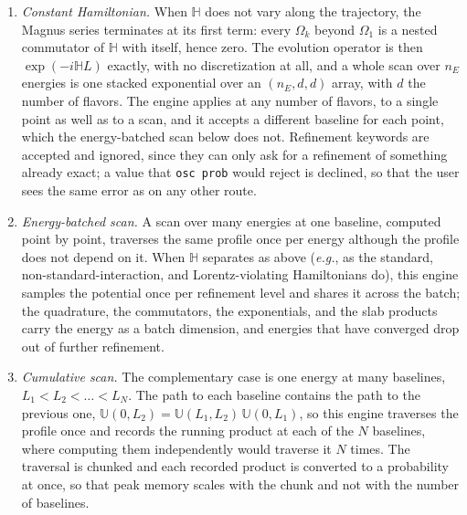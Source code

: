 \documentclass[final,5p,times,twocolumn,sort,compress]{elsarticle}
\makeatletter
\newcommand{\eg}{{\it e.g.}}
\DeclareRobustCommand{\_}{%
  \ifmmode\nfss@text{\textunderscore}\else\textunderscore\allowbreak\fi}
\makeatother
\begin{document}
\begin{enumerate}
Four conditions must hold for this engine to take a request: two flavors, a profile built with {\tt exp\_density\_profile} (the default of the solar wrappers; a tabulated solar model is not one), a single baseline, and no slab edges or breakpoints. Under {\tt strategy='auto'}, it is also skipped when a request at a tolerance of $10^{-6}$ or looser goes to the general ladder, as described below. (The limit of two flavors is empirical: the neglected second-order term is about a thousand times larger at three flavors than at two, and the number of slabs needed to certify an answer is then too large for the engine to be fast.) At an MSW resonance, the matter term is no longer small, the answers stop agreeing before the engine reaches its limit on the number of slabs, and the request passes to the next engine.
\smallskip
\item \emph{Constant Hamiltonian.} When $\mathbb{H}$ does not vary along the trajectory, the Magnus series terminates at its first term: every $\Omega_k$ beyond $\Omega_1$ is a nested commutator of $\mathbb{H}$ with itself, hence zero. The evolution operator is then $\exp(-i\mathbb{H}L)$ exactly, with no discretization at all, and a whole scan over $n_E$ energies is one stacked exponential over an $(n_E, d, d)$ array, with $d$ the number of flavors. The engine applies at any number of flavors, to a single point as well as to a scan, and it accepts a different baseline for each point, which the energy-batched scan below does not. Refinement keywords are accepted and ignored, since they can only ask for a refinement of something already exact; a value that {\tt osc\_prob} would reject is declined, so that the user sees the same error as on any other route.
\smallskip
\item \emph{Energy-batched scan.} A scan over many energies at one baseline, computed point by point, traverses the same profile once per energy although the profile does not depend on it. When $\mathbb{H}$ separates as above (\eg, as the standard, non-standard-interaction, and Lorentz-violating Hamiltonians do), this engine samples the potential once per refinement level and shares it across the batch; the quadrature, the commutators, the exponentials, and the slab products carry the energy as a batch dimension, and energies that have converged drop out of further refinement.
\smallskip
\item \emph{Cumulative scan.} The complementary case is one energy at many baselines, $L_1 < L_2 < \dots < L_N$. The path to each baseline contains the path to the previous one, $\mathbb{U}(0, L_2) = \mathbb{U}(L_1, L_2)\,\mathbb{U}(0, L_1)$, so this engine traverses the profile once and records the running product at each of the $N$ baselines, where computing them independently would traverse it $N$ times. The traversal is chunked and each recorded product is converted to a probability at once, so that peak memory scales with the chunk and not with the number of baselines.

\end{enumerate}
\end{document}
